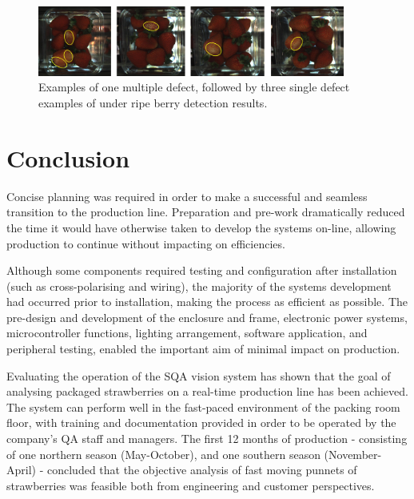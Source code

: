 \documentclass[fleqn,twoside,12pt]{report}
\begin{document}
\begin{figure}[h]
	\centering
	\includegraphics[width=0.9\textwidth]{UR_berries.png}
	\caption{Examples of one multiple defect, followed by three single defect examples of under ripe berry detection results.}
	\label{fig:UR_berries}
\end{figure}








\section{Conclusion}

Concise planning was required in order to make a successful and seamless transition to the production line. Preparation and pre-work dramatically reduced the time it would have otherwise taken to develop the systems on-line, allowing production to continue without impacting on efficiencies.

Although some components required testing and configuration after installation (such as cross-polarising and wiring), the majority of the systems development had occurred prior to installation, making the process as efficient as possible. The pre-design and development of the enclosure and frame, electronic power systems, microcontroller functions, lighting arrangement, software application, and peripheral testing, enabled the important aim of minimal impact on production.

Evaluating the operation of the SQA vision system has shown that the goal of analysing packaged strawberries on a real-time production line has been achieved. The system can perform well in the fast-paced environment of the packing room floor, with training and documentation provided in order to be operated by the company's QA staff and managers. The first 12 months of production - consisting of one northern season (May-October), and one southern season (November-April) - concluded that the objective analysis of fast moving punnets of strawberries was feasible both from engineering and customer perspectives.  



\newpage
\end{document}
